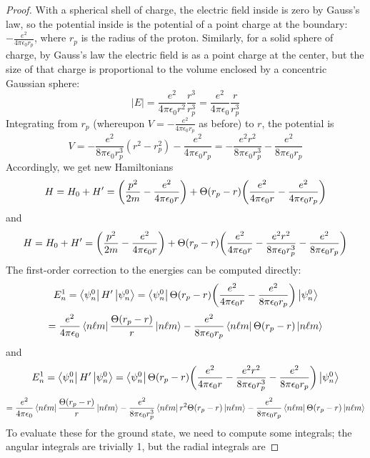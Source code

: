 \documentclass{article}
\begin{document}
\begin{proof}
  With a spherical shell of charge, the electric field inside is zero by Gauss's law,
  so the potential inside is the potential of a point charge at the boundary: $-\frac{e^{2}}{4\pi \epsilon_{0}r_{p}}$,
  where $r_{p}$ is the radius of the proton.
  Similarly, for a solid sphere of charge, by Gauss's law the electric field is as a point charge at the center,
  but the size of that charge is proportional to the volume enclosed by a concentric Gaussian sphere:
  \[
    |E| = \frac{e^{2}}{4\pi\epsilon_{0}r^{2}}\frac{r^{3}}{r_{p}^{3}} = \frac{e^{2}}{4\pi\epsilon_{0}}\frac{r}{r_{p}^{3}}
  \]
  Integrating from $r_{p}$ (whereupon $V = -\frac{e^{2}}{4\pi\epsilon_{0}r_{p}}$ as before) to $r$, the potential is
  \[
    V = -\frac{e^{2}}{8\pi\epsilon_{0}r_{p}^{3}}(r^{2} - r_{p}^{2}) - \frac{e^{2}}{4\pi\epsilon_{0}r_{p}}
    = -\frac{e^{2}r^{2}}{8\pi\epsilon_{0}r_{p}^{3}} - \frac{e^{2}}{8\pi\epsilon_{0} r_{p}}
  \]
  Accordingly, we get new Hamiltonians
  \[
    H = H_{0} + H' = \qty(\frac{p^{2}}{2m} - \frac{e^{2}}{4\pi\epsilon_{0} r}) + \Theta(r_{p} - r)\qty(\frac{e^{2}}{4\pi\epsilon_{0} r}
    - \frac{e^{2}}{4\pi\epsilon_{0} r_{p}})
  \]
  and
  \[
    H = H_{0} + H' = \qty(\frac{p^{2}}{2m} - \frac{e^{2}}{4\pi\epsilon_{0} r}) + \Theta(r_{p} - r)\qty(\frac{e^{2}}{4\pi\epsilon_{0} r}
    - \frac{e^{2}r^{2}}{8\pi\epsilon_{0} r_{p}^{3}} - \frac{e^{2}}{8\pi\epsilon_{0}r_{p}})
  \]
  The first-order correction to the energies can be computed directly:
  \[
    E_{n}^{1} = \bra{\psi_{n}^{0}} H' \ket{\psi_{n}^{0}}
    = \bra{\psi_{n}^{0}} \Theta(r_{p} - r)\qty(\frac{e^{2}}{4\pi\epsilon_{0} r} - \frac{e^{2}}{8\pi\epsilon_{0} r_{p}}) \ket{\psi_{n}^{0}}
  \]
  \[
    = \frac{e^{2}}{4\pi\epsilon_{0}}\bra{n\ell m} \frac{\Theta(r_{p} - r)}{r} \ket{n\ell m}
    - \frac{e^{2}}{8\pi\epsilon_{0} r_{p}}\bra{n\ell m} \Theta(r_{p} - r) \ket{n\ell m}
  \]
  and
  \[
    E_{n}^{1} = \bra{\psi_{n}^{0}} H' \ket{\psi_{n}^{0}}
    = \bra{\psi_{n}^{0}} \Theta(r_{p} - r)\qty(\frac{e^{2}}{4\pi\epsilon_{0} r} - \frac{e^{2}r^{2}}{8\pi\epsilon_{0} r_{p}^{3}}
    - \frac{e^{2}}{8\pi\epsilon_{0} r_{p}}) \ket{\psi_{n}^{0}}
  \]
  \[
    = \frac{e^{2}}{4\pi\epsilon_{0}}\bra{n\ell m} \frac{\Theta(r_{p} - r)}{r} \ket{n\ell m}
    - \frac{e^{2}}{8\pi\epsilon_{0}r_{p}^{3}}\bra{n\ell m} r^{2}\Theta(r_{p} - r) \ket{n\ell m}
    - \frac{e^{2}}{8\pi\epsilon_{0} r_{p}}\bra{n\ell m} \Theta(r_{p} - r) \ket{n\ell m}
  \]
  To evaluate these for the ground state, we need to compute some integrals; the angular integrals are trivially 1,
  but the radial integrals are

\end{proof}
\end{document}
